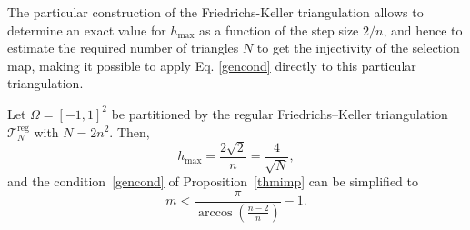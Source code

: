 \documentclass{svjour3}
\begin{document}
\vspace{2mm}

The particular construction of the Friedrichs-Keller triangulation allows to determine an exact value for $ h_{\max} $ as a function of the step size $2/n$, and hence to estimate the required number of triangles $N$ to get the injectivity of the selection map, making it possible to apply Eq. \eqref{gencond} directly to this particular triangulation.

\begin{corollary}
Let $\Omega=[-1,1]^2$ be partitioned by the regular Friedrichs–Keller triangulation $ \mathcal{T}^{\mathrm{reg}}_{N} $ with $N = 2n^2$. Then,
\begin{equation*}
    h_{\max} = \frac{2 \sqrt{2}}{n} = \frac{4}{\sqrt{N}},
\end{equation*}
and the condition~\eqref{gencond} of Proposition~\ref{thmimp} can be simplified to
\begin{equation}\label{conditionOnm}
    m<\frac{\pi}{\arccos\left(\frac{n-2}{n}\right)}-1.
\end{equation}
\end{corollary}
\end{document}
